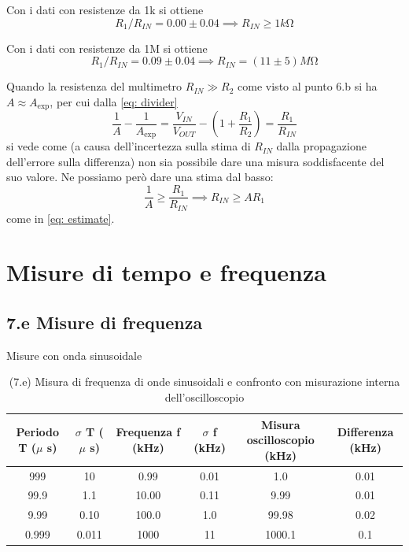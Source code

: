 \documentclass[10pt, a4paper, italian]{article}
\begin{document}
Con i dati con resistenze da 1k si ottiene
\begin{equation}\label{eq: estimate}
R_1/R_{IN} = 0.00  \pm  0.04   \implies  R_{IN} \geq 1 \si{k\ohm}
\end{equation}


Con i dati con resistenze da 1M si ottiene
\[ R_1/R_{IN} = 0.09  \pm  0.04   \implies  R_{IN} = (11 \pm  5) \si{M\ohm}
\]

Quando la resistenza del multimetro $R_{IN} \gg R_2$ come visto al punto
6.b si ha $A \approx A_{\exp}$, per cui dalla \eqref{eq: divider}
\[
\frac{1}{A} - \frac{1}{A_{\exp}} = \frac{V_{IN}}{V_{OUT}} -
(1 +  \frac{R_1}{R_2}) = \frac{R_1}{R_{IN}}
\]
si vede come (a causa dell'incertezza sulla stima di $R_{IN}$ dalla
propagazione dell'errore sulla differenza) non sia possibile dare una misura
soddisfacente del suo valore. Ne possiamo però dare una stima dal basso:
\[
\frac{1}{A} \geq \frac{R_1}{R_{IN}} \implies R_{IN} \geq A R_1
\]
come in \eqref{eq: estimate}.

\section{Misure di tempo e frequenza}

\subsection*{7.e Misure di frequenza}
Misure con onda sinusoidale
\begin{table}[h]
\centering
\begin{tabular}{|c|c|c|c|c|c|}
\hline 
Periodo T ($\mu$ s)& $\sigma$ T ($\mu$ s) &Frequenza f (kHz) & $\sigma$ f (kHz) &
Misura oscilloscopio (kHz) & Differenza (kHz)\\
\hline 
999 & 10 & 0.99 & 0.01 & 1.0 & 0.01 \\
99.9 & 1.1 & 10.00 & 0.11 & 9.99 & 0.01 \\
9.99 & 0.10 & 100.0 & 1.0 & 99.98 & 0.02 \\
0.999 & 0.011 & 1000 & 11 & 1000.1 & 0.1 \\
\hline 
\end{tabular} 
\caption{(7.e) Misura di frequenza di onde sinusoidali e confronto con
misurazione interna dell'oscilloscopio }
\end{table}
\end{document}
